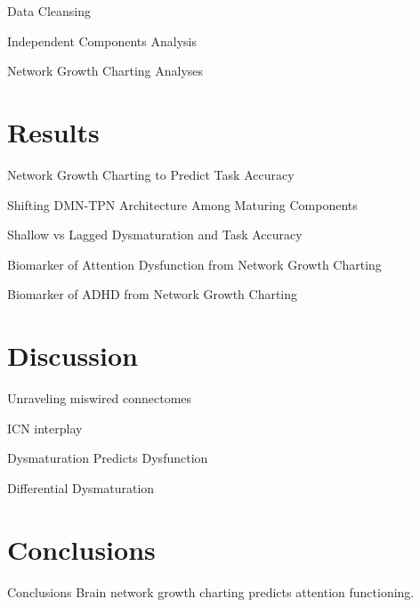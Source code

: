 \documentclass[presentation]{beamer}
\begin{document}
\begin{frame}[label={sec:orgheadline14}]{Data Cleansing}
\end{frame}
\begin{frame}[label={sec:orgheadline15}]{Independent Components Analysis}
\end{frame}
\begin{frame}[label={sec:orgheadline16}]{Network Growth Charting Analyses}
\end{frame}
\section{Results}
\label{sec:orgheadline23}
\begin{frame}[label={sec:orgheadline18}]{Network Growth Charting to Predict Task Accuracy}
\end{frame}
\begin{frame}[label={sec:orgheadline19}]{Shifting DMN-TPN Architecture Among Maturing Components}
\end{frame}
\begin{frame}[label={sec:orgheadline20}]{Shallow vs Lagged Dysmaturation and Task Accuracy}
\end{frame}
\begin{frame}[label={sec:orgheadline21}]{Biomarker of Attention Dysfunction from Network Growth Charting}
\end{frame}
\begin{frame}[label={sec:orgheadline22}]{Biomarker of ADHD from Network Growth Charting}
\end{frame}
\section{Discussion}
\label{sec:orgheadline28}
\begin{frame}[label={sec:orgheadline24}]{Unraveling miswired connectomes}
\end{frame}
\begin{frame}[label={sec:orgheadline25}]{ICN interplay}
\end{frame}
\begin{frame}[label={sec:orgheadline26}]{Dysmaturation Predicts Dysfunction}
\end{frame}
\begin{frame}[label={sec:orgheadline27}]{Differential Dysmaturation}
\end{frame}
\section{Conclusions}
\label{sec:orgheadline30}
\begin{frame}[label={sec:orgheadline29}]{Conclusions}
Brain network growth charting predicts attention functioning.
\end{frame}
\end{document}
